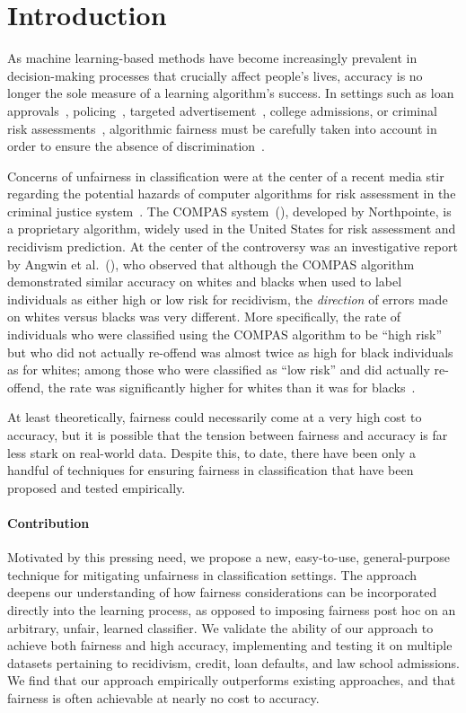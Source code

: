 \section{Introduction}
As machine learning-based methods have become increasingly prevalent in decision-making processes
that crucially affect people's lives, accuracy is no longer the sole
measure of a learning algorithm's success. In settings such as loan approvals~\cite{tracking}, policing~\cite{stopandfrisk}, targeted advertisement~\cite{latanyasweeney}, college admissions, or criminal risk assessments~\cite{machinebias}, algorithmic fairness must be carefully taken into account in order to ensure the absence of discrimination~\cite{bigdatasdisparateimpact, whiteguyproblem}.

Concerns of unfairness in classification were at the center of a recent media stir regarding the potential hazards of computer algorithms for risk assessment in the criminal justice system~\cite{machinebias,senttoprison}. The COMPAS system~(\citeyear{compasguide}), developed by Northpointe, is a proprietary algorithm, widely used in the United States for risk assessment and recidivism prediction. 
At the center of the controversy was an investigative report by Angwin et al.~(\citeyear{machinebias}), who observed that although the COMPAS algorithm demonstrated similar accuracy on whites and blacks when used to label individuals as either high or low risk for recidivism, the {\em direction} of errors made on whites versus blacks was very different.
More specifically, the rate of individuals who were classified using the COMPAS algorithm to be ``high risk'' but who did not actually re-offend was almost twice as high for black individuals as for whites; among those who were classified as ``low risk'' and did actually re-offend, the rate was significantly higher for whites than it was for blacks~\cite{ppanalysis}.

At least theoretically, fairness could necessarily come at a very high cost to accuracy, but it is possible that the tension between fairness and accuracy is far less stark on real-world data. Despite this, to date, there have been only a handful of techniques for ensuring fairness in classification that have been proposed and tested empirically.

\paragraph{Contribution} Motivated by this pressing need, we propose a new, easy-to-use, general-purpose technique for mitigating unfairness in classification settings. The approach deepens our understanding of how fairness considerations can be incorporated directly into the learning process, as opposed to imposing fairness post hoc on an arbitrary, unfair, learned classifier. We validate the ability of our approach to achieve both fairness and high accuracy, implementing and testing it on multiple datasets pertaining to recidivism, credit, loan defaults, and law school admissions. We find that our approach empirically outperforms existing approaches, and that fairness is often achievable at nearly no cost to accuracy.

